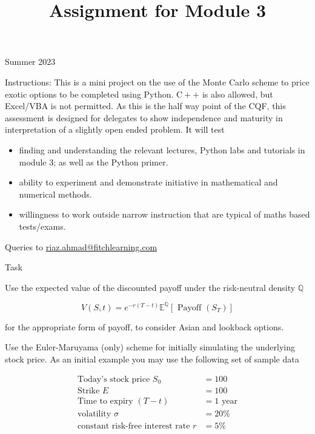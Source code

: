 \documentclass[10pt]{article}
\title{Assignment for Module 3 }
\author{}
\date{}
\begin{document}
\maketitle
Summer 2023

Instructions: This is a mini project on the use of the Monte Carlo scheme to price exotic options to be completed using Python. $\mathrm{C}++$ is also allowed, but Excel/VBA is not permitted. As this is the half way point of the CQF, this assessment is designed for delegates to show independence and maturity in interpretation of a slightly open ended problem. It will test

\begin{itemize}
  \item finding and understanding the relevant lectures, Python labs and tutorials in module 3; as well as the Python primer.

  \item ability to experiment and demonstrate initiative in mathematical and numerical methods.

  \item willingness to work outside narrow instruction that are typical of maths based tests/exams.

\end{itemize}

Queries to \href{mailto:riaz.ahmad@fitchlearning.com}{riaz.ahmad@fitchlearning.com}

Task

Use the expected value of the discounted payoff under the risk-neutral density $\mathbb{Q}$

$$
V(S, t)=e^{-r(T-t)} \mathbb{E}^{\mathbb{Q}}\left[\text { Payoff }\left(S_{T}\right)\right]
$$

for the appropriate form of payoff, to consider Asian and lookback options.

Use the Euler-Maruyama (only) scheme for initially simulating the underlying stock price. As an initial example you may use the following set of sample data

$$
\begin{aligned}
\text { Today's stock price } S_{0} & =100 \\
\text { Strike } E & =100 \\
\text { Time to expiry }(T-t) & =1 \text { year } \\
\text { volatility } \sigma & =20 \% \\
\text { constant risk-free interest rate } r & =5 \%
\end{aligned}
$$
\end{document}
